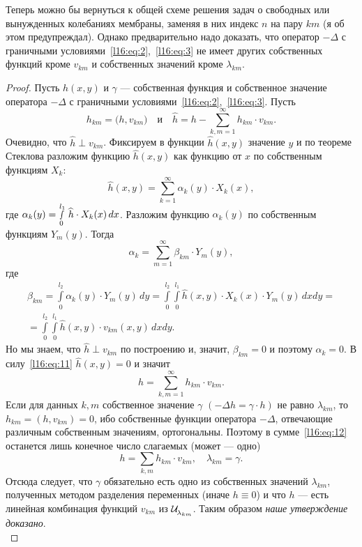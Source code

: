 Теперь можно бы вернуться к общей схеме решения задач о свободных или вынужденных колебаниях мембраны, заменяя в них индекс $n$ на пару $km$ (я об этом предупреждал). Однако предварительно надо доказать, что оператор $-\Delta$ с граничными условиями~\eqref{l16:eq:2},~\eqref{l16:eq:3} не имеет других собственных функций кроме $v_{km}$ и собственных значений кроме $\lambda_{km}$.
\begin{proof}
	Пусть $h(x,y)$ и $\gamma$ --- собственная функция и собственное значение оператора $-\Delta$ с граничными условиями~\eqref{l16:eq:2},~\eqref{l16:eq:3}. Пусть 
	\begin{equation*}
		 h_{km}=\big(h, v_{km}\big)\quad\text{и}\quad\widehat{h}= h-\sum\limits_{k,m=1}^{\infty}h_{km}\cdot v_{km}.
	\end{equation*}
	Очевидно, что $\widehat{h}\perp v_{km}$. Фиксируем в функции $\widehat{h}(x,y)$ значение $y$ и по теореме Стеклова разложим функцию $\widehat{h}(x,y)$ как функцию от $x$ по собственным функциям $X_k$:
	\begin{equation}\label{l16:eq:11}
		\widehat{h}(x,y)=\sum\limits_{k=1}^{\infty}\alpha_k(y)\cdot X_k(x),
	\end{equation} 
	где $\displaystyle\alpha_k(y)=\smallint\limits_0^{l_1}\,\widehat{h}\cdot X_k(x)\,dx$. Разложим функцию $\alpha_k(y)$ по собственным функциям $Y_m(y)$. Тогда 
	\begin{equation*}
		\alpha_k=\sum\limits_{m=1}^{\infty}\beta_{km}\cdot Y_{m}(y),
	\end{equation*}
	где
	\begin{multline*}
		\beta_{km}=\int\limits_0^{l_2}\alpha_k(y)\cdot Y_{m}(y)\,dy=\int\limits_0^{l_2}\!\int\limits_0^{l_1}\widehat{h}(x,y)\cdot X_k(x)\cdot Y_m(y)\,dxdy=\\=\int\limits_0^{l_2}\!\int\limits_0^{l_1}\widehat{h}(x,y)\cdot v_{km}(x,y)\,dxdy.
	\end{multline*}
	Но мы знаем, что $\widehat{h}\perp v_{km}$ по построению и, значит, $\beta_{km}=0$ и поэтому $\alpha_k=0$. В силу~\eqref{l16:eq:11} $\widehat{h}(x,y)=0$ и значит
	\begin{equation}\label{l16:eq:12}
		 h=\sum\limits_{k,m=1}^{\infty}h_{km}\cdot v_{km}.
	\end{equation}
	Если для данных $k,m$ собственное значение $\gamma$ $\left(-\Delta h=\gamma\cdot h\right)$ не равно $\lambda_{km}$, то $h_{km}=(h,v_{km})=0$, ибо собственные функции оператора $-\Delta$, отвечающие различным собственным значениям, ортогональны. Поэтому в сумме~\eqref{l16:eq:12} останется лишь конечное число слагаемых (может --- одно)
	\begin{equation}\label{l16:eq:13}
		 h=\sum\limits_{k,m}h_{km}\cdot v_{km},\quad \lambda_{km}=\gamma.
	\end{equation}
	Отсюда следует, что $\gamma$ обязательно есть одно из собственных значений $\lambda_{km}$, полученных методом разделения переменных (иначе $h\equiv0$) и что $h$ --- есть линейная комбинация функций $v_{km}$ из $\Ul[\lambda_{km}]$. Таким образом \emph{наше утверждение доказано}.\\
\end{proof}  
